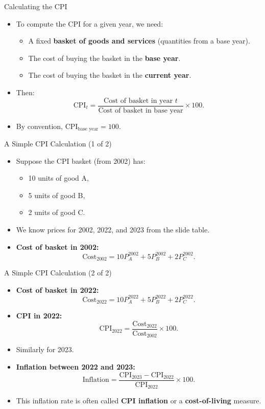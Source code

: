 \documentclass[aspectratio=169]{beamer}
\begin{document}
\begin{frame}{Calculating the CPI}
\transfade
\begin{itemize}[<+->]
  \item To compute the CPI for a given year, we need:
  \begin{itemize}[<+->]
    \item A fixed \textbf{basket of goods and services} (quantities from a base year).
    \item The cost of buying the basket in the \textbf{base year}.
    \item The cost of buying the basket in the \textbf{current year}.
  \end{itemize}
  \item Then:
  \[
    \text{CPI}_t = 
    \frac{\text{Cost of basket in year } t}{\text{Cost of basket in base year}} \times 100.
  \]
  \item By convention, \(\text{CPI}_{\text{base year}} = 100\).
\end{itemize}
\end{frame}

\begin{frame}{A Simple CPI Calculation (1 of 2)}
\transfade
\begin{itemize}[<+->]
  \item Suppose the CPI basket (from 2002) has:
  \begin{itemize}[<+->]
    \item 10 units of good A,
    \item 5 units of good B,
    \item 2 units of good C.
  \end{itemize}
  \item We know prices for 2002, 2022, and 2023 from the slide table.
  \item \textbf{Cost of basket in 2002:}
  \[
    \text{Cost}_{2002} = 
    10 P_A^{2002} + 5 P_B^{2002} + 2 P_C^{2002}.
  \]
\end{itemize}
\end{frame}

\begin{frame}{A Simple CPI Calculation (2 of 2)}
\transfade
\begin{itemize}[<+->]
  \item \textbf{Cost of basket in 2022:}
  \[
    \text{Cost}_{2022} = 
    10 P_A^{2022} + 5 P_B^{2022} + 2 P_C^{2022}.
  \]
  \item \textbf{CPI in 2022:}
  \[
    \text{CPI}_{2022} = 
    \frac{\text{Cost}_{2022}}{\text{Cost}_{2002}} \times 100.
  \]
  \item Similarly for 2023.
  \item \textbf{Inflation between 2022 and 2023:}
  \[
    \text{Inflation} = 
    \frac{\text{CPI}_{2023} - \text{CPI}_{2022}}{\text{CPI}_{2022}} \times 100.
  \]
  \item This inflation rate is often called \textbf{CPI inflation} or a \textbf{cost-of-living} measure.
\end{itemize}
\end{frame}
\end{document}
